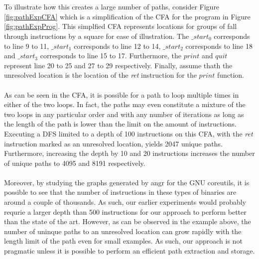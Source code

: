 \documentclass{kththesis}
\renewcommand{\it}[1]{\textit{#1}}
\begin{document}
\\ \\
To illustrate how this creates a large number of paths, consider Figure \ref{fig:pathExpCFA} which is a simplification of the CFA for the program in Figure \ref{fig:pathExpProg}. This simplfied CFA represents locations for groups of fall through instructions by a square for ease of illustration. The $\_start_0$ corresponds to line 9 to 11, $\_start_1$ corresponds to line 12 to 14, $\_start_2$ corresponds to line 18 and $\_start_3$ corresponds to line 15 to 17. Furthermore, the $print$ and $quit$ represent line 20 to 25 and 27 to 29 respectively. Finally, assume thath the unresolved location is the location of the \it{ret} instruction for the $print$ function. 
\\ \\
As can be seen in the CFA, it is possible for a path to loop multiple times in either of the two loops. In fact, the paths may even constitute a mixture of the two loops in any particular order and with any number of iterations as long as the length of the path is lower than the limit on the amount of instructions. Executing a DFS limited to a depth of 100 instructions on this CFA, with the \it{ret} instruction marked as an unresolved location, yields 2047 unique paths. Furthermore, increasing the depth by 10 and 20 instructions increases the number of unique paths to 4095 and 8191 respectively. 
\\ \\
Moreover, by studying the graphs generated by angr for the GNU coreutils, it is possible to see that the number of instructions in these types of binaries are around a couple of thousands. As such, our earlier experiments would probably requrie a larger depth than 500 instructions for our approach to perform better than the state of the art. However, as can be observed in the example above, the number of uninque paths to an unresolved location can grow rapidly with the length limit of the path even for small examples. As such, our approach is not pragmatic unless it is possible to perform an efficient path extraction and storage.
\end{document}
